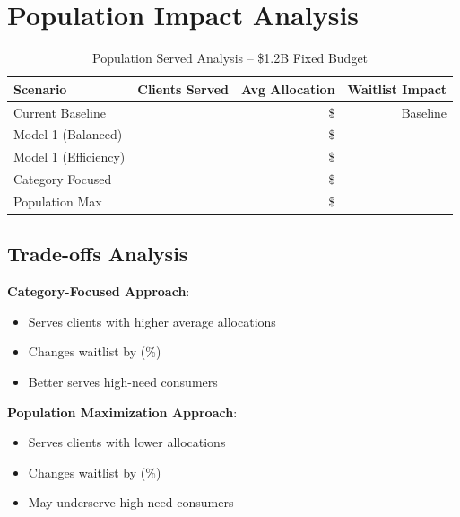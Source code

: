 \section{Population Impact Analysis}

\begin{table}[h]
\centering
\caption{Population Served Analysis -- \$1.2B Fixed Budget}
\begin{tabular}{lrrr}
\toprule
\textbf{Scenario} & \textbf{Clients Served} & \textbf{Avg Allocation} & \textbf{Waitlist Impact} \\
\midrule
Current Baseline & \ModelOnePopcurrentbaselineClients{} & \$\ModelOnePopcurrentbaselineAvgAlloc{} & Baseline \\
Model 1 (Balanced) & \ModelOnePopmodelbalancedClients{} & \$\ModelOnePopmodelbalancedAvgAlloc{} & \ModelOnePopmodelbalancedWaitlistChange{} \\
Model 1 (Efficiency) & \ModelOnePopmodelefficiencyClients{} & \$\ModelOnePopmodelefficiencyAvgAlloc{} & \ModelOnePopmodelefficiencyWaitlistChange{} \\
Category Focused & \ModelOnePopcategoryfocusedClients{} & \$\ModelOnePopcategoryfocusedAvgAlloc{} & \ModelOnePopcategoryfocusedWaitlistChange{} \\
Population Max & \ModelOnePoppopulationmaximizedClients{} & \$\ModelOnePoppopulationmaximizedAvgAlloc{} & \ModelOnePoppopulationmaximizedWaitlistChange{} \\
\bottomrule
\end{tabular}
\end{table}

\subsection{Trade-offs Analysis}

\textbf{Category-Focused Approach}:
\begin{itemize}
    \item Serves \ModelOnePopcategoryfocusedClients{} clients with higher average allocations
    \item Changes waitlist by \ModelOnePopcategoryfocusedWaitlistChange{} (\ModelOnePopcategoryfocusedWaitlistPct{}\%)
    \item Better serves high-need consumers
\end{itemize}

\textbf{Population Maximization Approach}:
\begin{itemize}
    \item Serves \ModelOnePoppopulationmaximizedClients{} clients with lower allocations
    \item Changes waitlist by \ModelOnePoppopulationmaximizedWaitlistChange{} (\ModelOnePoppopulationmaximizedWaitlistPct{}\%)
    \item May underserve high-need consumers
\end{itemize}

